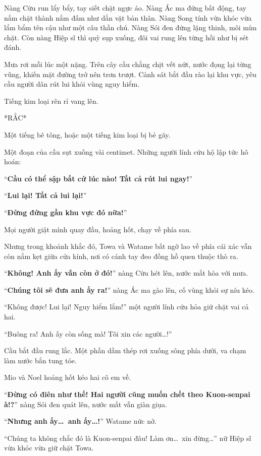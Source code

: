 \documentclass[../main.tex]{subfiles}
\begin{document}
Nàng Cừu run lẩy bẩy, tay siết chặt ngực áo. Nàng Ác ma đứng bất động, tay nắm chặt thành nắm đấm như dằn vặt bản thân. Nàng Song tính vừa khóc vừa lẩm bẩm tên cậu như một câu thần chú. Nàng Sói đen đứng lặng thinh, môi mím chặt. Còn nàng Hiệp sĩ thì quỳ sụp xuống, đôi vai rung lên từng hồi như bị sét đánh.

Mưa rơi mỗi lúc một nặng. Trên cây cầu chằng chịt vết nứt, nước đọng lại từng vũng, khiến mặt đường trở nên trơn trượt. Cảnh sát bắt đầu rào lại khu vực, yêu cầu người dân rút lui khỏi vùng nguy hiểm.

Tiếng kim loại rên rỉ vang lên.

*RẮC*

Một tiếng bê tông, hoặc một tiếng kim loại bị bẻ gãy.

Một đoạn của cầu sụt xuống vài centimet. Những người lính cứu hộ lập tức hô hoán:

``\textbf{Cầu có thể sập bất cứ lúc nào! Tất cả rút lui ngay!}''

``\textbf{Lui lại! Tất cả lui lại!}''

``\textbf{Đừng đứng gần khu vực đó nữa!}''

Mọi người giật mình quay đầu, hoảng hốt, chạy về phía sau.

Nhưng trong khoảnh khắc đó, Towa và Watame bất ngờ lao về phía cái xác vẫn còn nằm kẹt giữa cửa kính, nơi có cánh tay đeo đồng hồ quen thuộc thò ra.

``\textbf{Không! Anh ấy vẫn còn ở đó!}'' nàng Cừu hét lên, nước mắt hòa với mưa.

``\textbf{Chúng tôi sẽ đưa anh ấy ra!}'' nàng Ác ma gào lên, cố vùng khỏi sự níu kéo.

``Không được! Lui lại! Nguy hiểm lắm!'' một người lính cứu hỏa giữ chặt vai cả hai.

``Buông ra! Anh ấy còn sống mà! Tôi xin các người\dots!''

Cầu bắt đầu rung lắc. Một phần dầm thép rơi xuống sông phía dưới, va chạm làm nước bắn tung tóe.

Mio và Noel hoảng hốt kéo hai cô em về.

``\textbf{Đừng có điên như thế! Hai người cũng muốn chết theo Kuon-senpai à!?}'' nàng Sói đen quát lên, nước mắt vẫn giàn giụa.

``\textbf{Nhưng anh ấy\dots\ anh ấy\dots!}'' Watame nức nở.

``Chúng ta không chắc đó là Kuon-senpai đâu! Làm ơn\dots\ xin đừng\dots'' nữ Hiệp sĩ vừa khóc vừa giữ chặt Towa.
\end{document}
